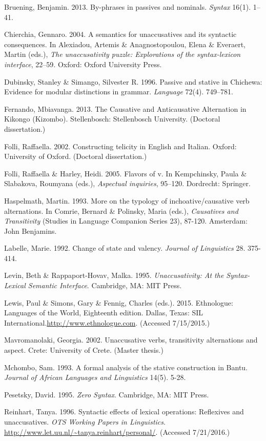 \documentclass[output=paper]{langsci/langscibook}
\begin{document}
\begin{styleTabellenberschrift}
\begin{styleTabellenberschrift}
Bruening, Benjamin. 2013. By-phrases in passives and nominals. \textit{Syntax} 16(1). 1–41.

Chierchia, Gennaro. 2004. A semantics for unaccusatives and its syntactic consequences. In Alexiadou, Artemis \& Anagnostopoulou, Elena \& Everaert, Martin (eds.), \textit{The unaccusativity puzzle: Explorations of the syntax-lexicon interface}, 22–59. Oxford: Oxford University Press.

Dubinsky, Stanley \& Simango, Silvester R. 1996. Passive and stative in Chichewa: Evidence for modular distinctions in grammar. \textit{Language} 72(4). 749–781.

Fernando, Mbiavanga. 2013. The Causative and Anticausative Alternation in Kikongo (Kizombo). Stellenbosch: Stellenbosch University. (Doctoral dissertation.)

Folli, Raffaella. 2002. Constructing telicity in English and Italian. Oxford: University of Oxford. (Doctoral dissertation.)

Folli, Raffaella \& Harley, Heidi. 2005. Flavors of v. In Kempchinsky, Paula \& Slabakova, Roumyana (eds.), \textit{Aspectual inquiries}, 95–120. Dordrecht: Springer.

Haspelmath, Martin. 1993. More on the typology of inchoative/causative verb alternations. In Comrie, Bernard \& Polinsky, Maria (eds.), \textit{Causatives and Transitivity} (Studies in Language Companion Series 23), 87-120. Amsterdam: John Benjamins.

Labelle, Marie. 1992. Change of state and valency. \textit{Journal of Linguistics }28. 375-414. 

Levin, Beth \& Rappaport-Hovav, Malka. 1995. \textit{Unaccusativity: At the Syntax-Lexical Semantic Interface}. Cambridge, MA: MIT Press.

Lewis, Paul \& Simons, Gary \& Fennig, Charles (eds.). 2015. Ethnologue: Languages of the World, Eighteenth edition. Dallas, Texas: SIL International.\url{http://www.ethnologue.com}. (Accessed 7/15/2015.)

Mavromanolaki, Georgia. 2002. Unaccusative verbs, transitivity alternations and aspect. Crete: University of Crete. (Master thesis.)

Mchombo, Sam. 1993. A formal analysis of the stative construction in Bantu. \textit{Journal of African Languages and Linguistics} 14(5). 5-28.

Pesetsky, David. 1995. \textit{Zero Syntax}. Cambridge, MA: MIT Press.

Reinhart, Tanya. 1996. Syntactic effects of lexical operations: Reflexives and unaccusatives. \textit{OTS Working Papers in Linguistics}. \url{http://www.let.uu.nl/~tanya.reinhart/personal/}. (Accessed 7/21/2016.)


\end{styleTabellenberschrift}
\end{styleTabellenberschrift}
\end{document}
